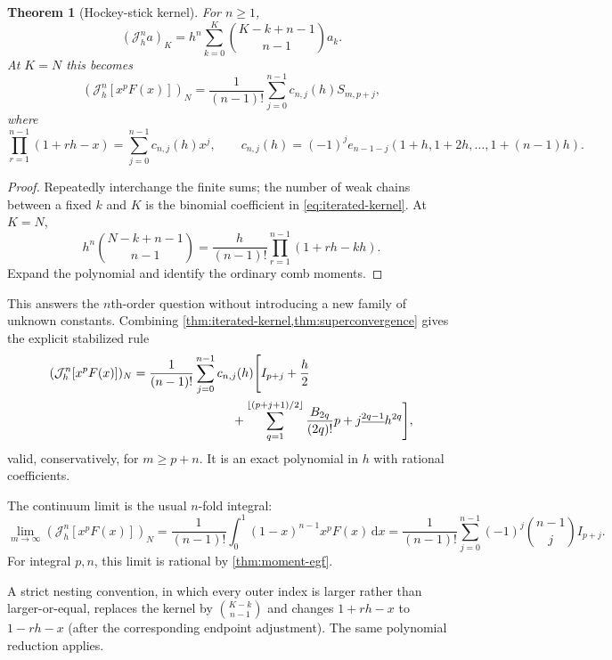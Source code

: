 \documentclass[11pt]{article}
\newtheorem{theorem}{Theorem}[section]
\theoremstyle{definition}
\theoremstyle{remark}
\newcommand{\fall}[2]{#1^{\underline{#2}}}
\newcommand{\dd}{\,\mathrm d}
\newcommand{\J}{\mathcal J}
\begin{document}
\begin{theorem}[Hockey-stick kernel]\label{thm:iterated-kernel}
For $n\ge1$,
\begin{equation}\label{eq:iterated-kernel}
 (\J_h^n a)_K
 =h^n\sum_{k=0}^{K}\binom{K-k+n-1}{n-1}a_k.
\end{equation}
At $K=N$ this becomes
\begin{equation}\label{eq:iterated-product}
 (\J_h^n[x^pF(x)])_N
 =\frac1{(n-1)!}\sum_{j=0}^{n-1}c_{n,j}(h)S_{m,p+j},
\end{equation}
where
\begin{equation}\label{eq:cnj}
 \prod_{r=1}^{n-1}(1+rh-x)
 =\sum_{j=0}^{n-1}c_{n,j}(h)x^j,
 \qquad
 c_{n,j}(h)=(-1)^j
 e_{n-1-j}(1+h,1+2h,\ldots,1+(n-1)h).
\end{equation}
\end{theorem}

\begin{proof}
Repeatedly interchange the finite sums; the number of weak chains between a
fixed $k$ and $K$ is the binomial coefficient in \eqref{eq:iterated-kernel}.
At $K=N$,
\[
 h^n\binom{N-k+n-1}{n-1}
 =\frac h{(n-1)!}\prod_{r=1}^{n-1}(1+rh-kh).
\]
Expand the polynomial and identify the ordinary comb moments.
\end{proof}

This answers the $n$th-order question without introducing a new family of
unknown constants.  Combining \cref{thm:iterated-kernel,thm:superconvergence}
gives the explicit stabilized rule
\begin{align}
 (\J_h^n[x^pF(x)])_N
 &=\frac1{(n-1)!}\sum_{j=0}^{n-1}c_{n,j}(h)
 \Biggl[
 I_{p+j}+\frac h2\notag\\
 &\hspace{28mm}+
 \sum_{q=1}^{\lfloor(p+j+1)/2\rfloor}
 \frac{B_{2q}}{(2q)!}\fall{p+j}{2q-1}h^{2q}
 \Biggr],\label{eq:iterated-stabilized}
\end{align}
valid, conservatively, for $m\ge p+n$.  It is an exact polynomial in $h$ with
rational coefficients.

The continuum limit is the usual $n$-fold integral:
\begin{equation}\label{eq:iterated-limit}
 \lim_{m\to\infty}(\J_h^n[x^pF(x)])_N
 =\frac1{(n-1)!}\int_0^1(1-x)^{n-1}x^pF(x)\dd x
 =\frac1{(n-1)!}\sum_{j=0}^{n-1}(-1)^j
   \binom{n-1}{j}I_{p+j}.
\end{equation}
For integral $p,n$, this limit is rational by \cref{thm:moment-egf}.

A strict nesting convention, in which every outer index is larger rather than
larger-or-equal, replaces the kernel by $\binom{K-k}{n-1}$ and changes
$1+rh-x$ to $1-rh-x$ (after the corresponding endpoint adjustment).  The same
polynomial reduction applies.
\end{document}
